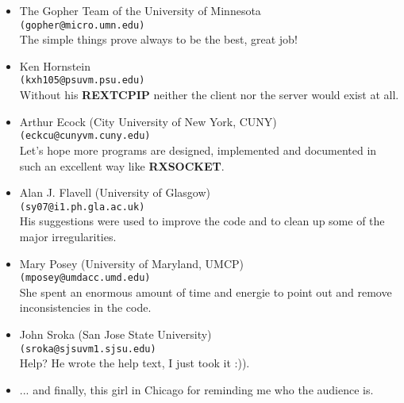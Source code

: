 \begin{itemize}
\item The Gopher Team of the University of Minnesota\\
      {\tt (gopher@micro.umn.edu)}\\
      The simple things prove always to be the best, great job!
 
\item Ken Hornstein\\
      {\tt (kxh105@psuvm.psu.edu)}\\
      Without his {\bf REXTCPIP} neither the client nor the server
      would exist at all.

\item Arthur Ecock (City University of New York, CUNY)\\
      {\tt (eckcu@cunyvm.cuny.edu)}\\
      Let's hope more programs are designed, implemented and
      documented in such an excellent way like {\bf RXSOCKET}.
 
 
\item Alan J. Flavell (University of Glasgow)\\
      {\tt (sy07@i1.ph.gla.ac.uk)}\\
      His suggestions were used to improve the code and to clean up
      some of the major irregularities.
 
\item Mary Posey (University of Maryland, UMCP)\\
      {\tt (mposey@umdacc.umd.edu)}\\
      She spent an enormous amount of time and energie to point out and
      remove inconsistencies in the code.

\item John Sroka (San Jose State University)\\
      {\tt (sroka@sjsuvm1.sjsu.edu)}\\
      Help?  He wrote the help text, I just took it :)).

\item ... and finally, this girl in Chicago for reminding me who the
      audience is.
\end{itemize} 



